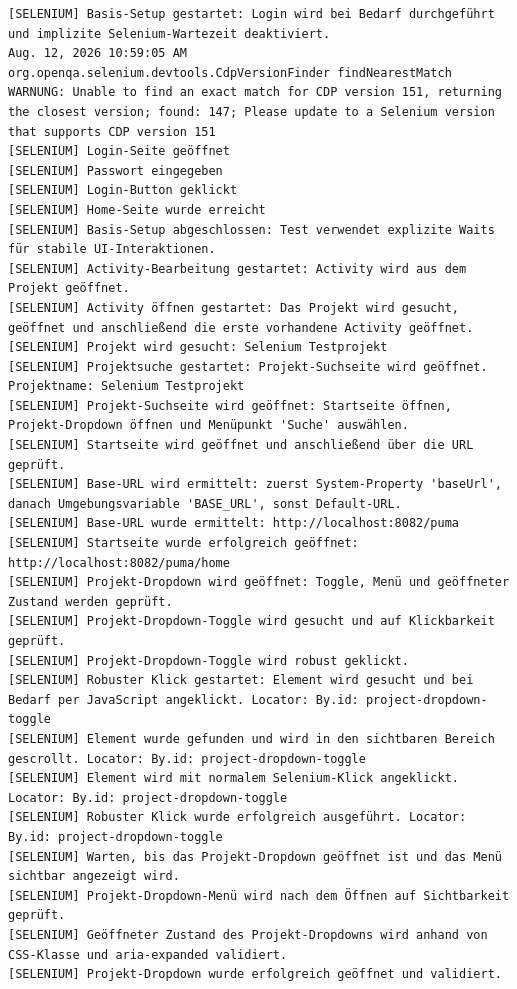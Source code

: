 \begin{lstlisting}[caption={Selenium -- Activity bearbeiten (Erfolgreich)}, label={lst:sel_edit_act_ok}, style=logStyle]
[SELENIUM] Basis-Setup gestartet: Login wird bei Bedarf durchgeführt und implizite Selenium-Wartezeit deaktiviert.
Aug. 12, 2026 10:59:05 AM org.openqa.selenium.devtools.CdpVersionFinder findNearestMatch
WARNUNG: Unable to find an exact match for CDP version 151, returning the closest version; found: 147; Please update to a Selenium version that supports CDP version 151
[SELENIUM] Login-Seite geöffnet
[SELENIUM] Passwort eingegeben
[SELENIUM] Login-Button geklickt
[SELENIUM] Home-Seite wurde erreicht
[SELENIUM] Basis-Setup abgeschlossen: Test verwendet explizite Waits für stabile UI-Interaktionen.
[SELENIUM] Activity-Bearbeitung gestartet: Activity wird aus dem Projekt geöffnet.
[SELENIUM] Activity öffnen gestartet: Das Projekt wird gesucht, geöffnet und anschließend die erste vorhandene Activity geöffnet.
[SELENIUM] Projekt wird gesucht: Selenium Testprojekt
[SELENIUM] Projektsuche gestartet: Projekt-Suchseite wird geöffnet. Projektname: Selenium Testprojekt
[SELENIUM] Projekt-Suchseite wird geöffnet: Startseite öffnen, Projekt-Dropdown öffnen und Menüpunkt 'Suche' auswählen.
[SELENIUM] Startseite wird geöffnet und anschließend über die URL geprüft.
[SELENIUM] Base-URL wird ermittelt: zuerst System-Property 'baseUrl', danach Umgebungsvariable 'BASE_URL', sonst Default-URL.
[SELENIUM] Base-URL wurde ermittelt: http://localhost:8082/puma
[SELENIUM] Startseite wurde erfolgreich geöffnet: http://localhost:8082/puma/home
[SELENIUM] Projekt-Dropdown wird geöffnet: Toggle, Menü und geöffneter Zustand werden geprüft.
[SELENIUM] Projekt-Dropdown-Toggle wird gesucht und auf Klickbarkeit geprüft.
[SELENIUM] Projekt-Dropdown-Toggle wird robust geklickt.
[SELENIUM] Robuster Klick gestartet: Element wird gesucht und bei Bedarf per JavaScript angeklickt. Locator: By.id: project-dropdown-toggle
[SELENIUM] Element wurde gefunden und wird in den sichtbaren Bereich gescrollt. Locator: By.id: project-dropdown-toggle
[SELENIUM] Element wird mit normalem Selenium-Klick angeklickt. Locator: By.id: project-dropdown-toggle
[SELENIUM] Robuster Klick wurde erfolgreich ausgeführt. Locator: By.id: project-dropdown-toggle
[SELENIUM] Warten, bis das Projekt-Dropdown geöffnet ist und das Menü sichtbar angezeigt wird.
[SELENIUM] Projekt-Dropdown-Menü wird nach dem Öffnen auf Sichtbarkeit geprüft.
[SELENIUM] Geöffneter Zustand des Projekt-Dropdowns wird anhand von CSS-Klasse und aria-expanded validiert.
[SELENIUM] Projekt-Dropdown wurde erfolgreich geöffnet und validiert.

\end{lstlisting}
